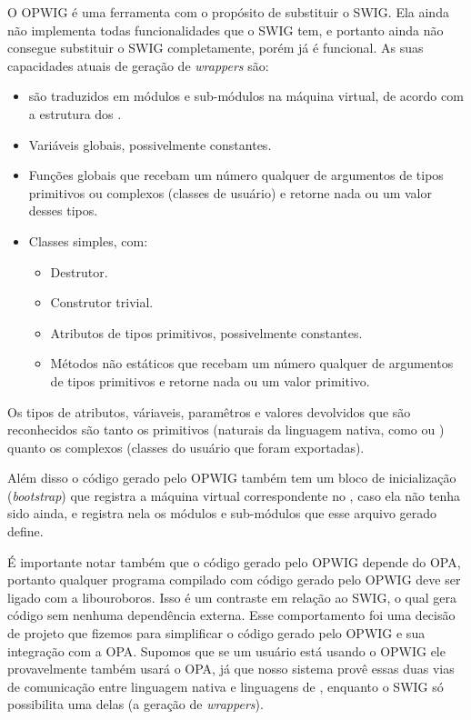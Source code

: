 O OPWIG é uma ferramenta com o propósito de substituir o SWIG.
Ela ainda não implementa todas funcionalidades que o SWIG tem, e portanto
ainda não consegue substituir o SWIG completamente, porém já é funcional.
As suas capacidades atuais de geração de \textit{wrappers} são:
\begin{itemize}
  \item {} são traduzidos em módulos e sub-módulos na máquina
    virtual, de acordo com a estrutura dos .
  \item Variáveis globais, possivelmente constantes.
  \item Funções globais que recebam um número qualquer de argumentos de tipos
    primitivos ou complexos (classes de usuário) e retorne nada ou um valor desses tipos.
  \item Classes simples, com:
    \begin{itemize}
      \item Destrutor.
      \item Construtor trivial.
      \item Atributos de tipos primitivos, possivelmente constantes.
      \item Métodos não estáticos que recebam um número qualquer de argumentos
        de tipos primitivos e retorne nada ou um valor primitivo.
    \end{itemize}
\end{itemize}
Os tipos de atributos, váriaveis, paramêtros e valores devolvidos que são reconhecidos
são tanto os primitivos (naturais da linguagem nativa, como  ou )
quanto os complexos (classes do usuário que foram exportadas).

Além disso o código gerado pelo OPWIG também tem um bloco de inicialização
(\textit{bootstrap}) que registra a máquina virtual correspondente no \SMgr{},
caso ela não tenha sido ainda, e registra nela os módulos e sub-módulos que esse
arquivo gerado define.

É importante notar também que o código gerado pelo OPWIG depende do OPA, 
portanto qualquer programa compilado com código gerado pelo OPWIG deve ser
ligado com a libouroboros. Isso é um contraste em relação ao SWIG, o qual gera
código sem nenhuma dependência externa. Esse comportamento foi uma decisão de
projeto que fizemos para simplificar o código gerado pelo OPWIG e sua integração
com a OPA. Supomos que se um usuário está usando o OPWIG ele provavelmente
também usará o OPA, já que nosso sistema provê essas duas vias de comunicação
entre linguagem nativa e linguagens de \script{}, enquanto o SWIG só possibilita
uma delas (a geração de \textit{wrappers}).

